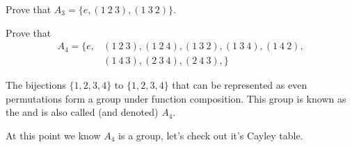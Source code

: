 \documentclass{ximera}
\begin{document}
\begin{exercise}
  Prove that $A_3 = \{e,(1\ 2\ 3), (1\ 3\ 2)\}$.
\end{exercise}

\begin{exercise}
  Prove that
  \begin{align*}
    A_4 =\{e, &(1\ 2\ 3), (1\ 2\ 4), (1\ 3 \ 2), (1\ 3\ 4),  (1\ 4\ 2),  \\
    &(1\ 4\ 3),(2 \ 3 \ 4), (2 \ 4 \ 3), \}
  \end{align*}
\end{exercise}


\begin{example}
  The bijections $\{1,2,3,4\}$ to $\{1,2,3,4\}$ that can be represented
  as even permutations form a group under function composition. This
  group is known as the  and is
  also called (and denoted) $A_4$.


  At this point we know $A_4$ is a group, let's check out it's Cayley
  table.
\end{example}
\end{document}
